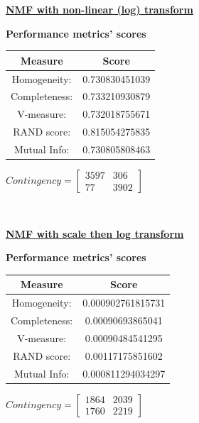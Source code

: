 \documentclass{report}
\begin{document}
\underline{\textbf{NMF with non-linear (log) transform}} 

\begin{center}
	\textbf{Performance metrics' scores} \\ \vspace{10pt}
	\begin{tabular}{*{2}{c}}
		\toprule
		\textbf{Measure} & \textbf{Score} \\
		\midrule
		Homogeneity: 		& 0.730830451039 \\
		\midrule
		Completeness: 		& 0.733210930879 \\
		\midrule
		V-measure: 			& 0.732018755671 \\
		\midrule
		RAND score: 		& 0.815054275835 \\
		\midrule
		Mutual Info: 		& 0.730805808463 \\
		\bottomrule
	\end{tabular}
	\qquad
	$Contingency = \left[\begin{array}{*{2}{c}}
			3597  & 306 \\
			77 	& 3902 
				\end{array}\right]
			$
\end{center}
\\ \vspace{20pt}


\underline{\textbf{NMF with scale then log transform}} 

\begin{center}
	\textbf{Performance metrics' scores} \\ \vspace{10pt}
	\begin{tabular}{*{2}{c}}
		\toprule
		\textbf{Measure} & \textbf{Score} \\
		\midrule
		Homogeneity: & 0.000902761815731 \\
		\midrule
		Completeness: & 0.00090693865041 \\
		\midrule
		V-measure: 	& 0.00090484541295  \\
		\midrule
		RAND score: & 0.00117175851602  \\
		\midrule
		Mutual Info: & 0.000811294034297  \\
		\bottomrule
	\end{tabular}
	\qquad
	$Contingency = \left[\begin{array}{*{2}{c}}
			1864 & 2039\\
			1760 & 2219 
				\end{array}\right]
			$
\end{center}
\end{document}
